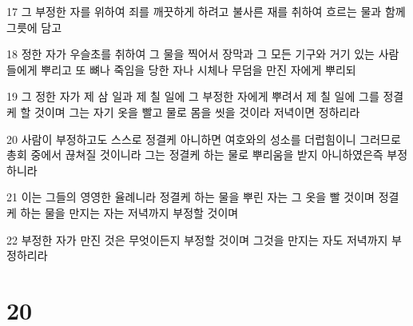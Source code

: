 \par 17 그 부정한 자를 위하여 죄를 깨끗하게 하려고 불사른 재를 취하여 흐르는 물과 함께 그릇에 담고
\par 18 정한 자가 우슬초를 취하여 그 물을 찍어서 장막과 그 모든 기구와 거기 있는 사람들에게 뿌리고 또 뼈나 죽임을 당한 자나 시체나 무덤을 만진 자에게 뿌리되
\par 19 그 정한 자가 제 삼 일과 제 칠 일에 그 부정한 자에게 뿌려서 제 칠 일에 그를 정결케 할 것이며 그는 자기 옷을 빨고 물로 몸을 씻을 것이라 저녁이면 정하리라
\par 20 사람이 부정하고도 스스로 정결케 아니하면 여호와의 성소를 더럽힘이니 그러므로 총회 중에서 끊쳐질 것이니라 그는 정결케 하는 물로 뿌리움을 받지 아니하였은즉 부정하니라
\par 21 이는 그들의 영영한 율례니라 정결케 하는 물을 뿌린 자는 그 옷을 빨 것이며 정결케 하는 물을 만지는 자는 저녁까지 부정할 것이며
\par 22 부정한 자가 만진 것은 무엇이든지 부정할 것이며 그것을 만지는 자도 저녁까지 부정하리라

\chapter{20}

